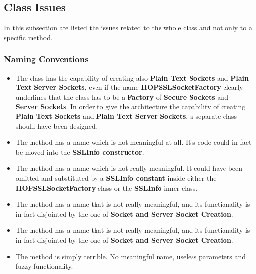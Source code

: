 \subsection{Class Issues}
In this subsection are listed the issues related to the whole class and not only to a specific method.
\subsubsection{Naming Conventions}
\begin{itemize}
		\begin{itemize}
			\item
				The class has the capability of creating also \textbf{Plain Text Sockets} and \textbf{Plain Text Server Sockets}, even if the name \textbf{IIOPSSLSocketFactory} clearly underlines that the class has to be a \textbf{Factory} of \textbf{Secure Sockets} and \textbf{Server Sockets}.
				In order to give the architecture the capability of creating \textbf{Plain Text Sockets} and \textbf{Plain Text Server Sockets}, a separate class should have been designed.
			\item
				The method
				has a name which is not meaningful at all.
				It's code could in fact be moved into the \textbf{SSLInfo constructor}.
			\item
				The method
				has a name which is not really meaningful.
				It could have been omitted and substituted by a \textbf{SSLInfo constant} inside either the \textbf{IIOPSSLSocketFactory} class or the \textbf{SSLInfo} inner class.
			\item
				The method
				has a name that is not really meaningful, and its functionality is in fact disjointed by the one of \textbf{Socket and Server Socket Creation}.
			\item
				The method 
				has a name that is not really meaningful, and its functionality is in fact disjointed by the one of \textbf{Socket and Server Socket Creation}.
			\item
				The method
				is simply terrible.
				No meaningful name, useless parameters and fuzzy functionality.
		\end{itemize}

\end{itemize}
